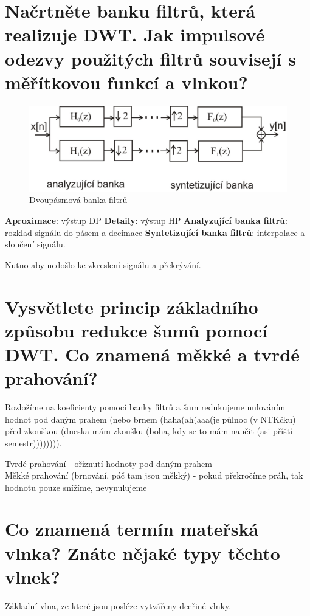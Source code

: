 \documentclass[a4paper,12pt]{article}   %
\begin{document}
\section{Načrtněte banku filtrů, která realizuje DWT. Jak impulsové odezvy použitých filtrů souvisejí s měřítkovou funkcí a vlnkou?}
\begin{figure}
        \centering
        \includegraphics[width=.6\textwidth]{fig/banka_filtru.png}
        \caption*{Dvoupásmová banka filtrů}
\end{figure}

\begin{outline}
        \1 \textbf{Aproximace}: výstup DP 
        \1 \textbf{Detaily}: výstup HP
        \1 \textbf{Analyzující banka filtrů}: rozklad signálu do pásem a decimace
        \1 \textbf{Syntetizující banka filtrů}: interpolace a sloučení signálu.
\end{outline}

Nutno aby nedošlo ke zkreslení signálu a překrývání. 


\section{Vysvětlete princip základního způsobu redukce šumů pomocí DWT. Co znamená měkké a tvrdé prahování?}

Rozložíme na koeficienty pomocí banky filtrů a šum redukujeme nulováním hodnot pod daným prahem (nebo brnem (haha(ah(aaa(je půlnoc (v NTKčku) před zkouškou (dneska mám zkoušku (boha, kdy se to mám naučit (asi příští semestr)))))))). 

Tvrdé prahování - oříznutí hodnoty pod daným prahem\\
Měkké prahování (brnování, páč tam jsou měkký) - pokud překročíme práh, tak hodnotu pouze snížíme, nevynulujeme



\section{Co znamená termín mateřská vlnka? Znáte nějaké typy těchto vlnek?}

Základní vlna, ze které jsou posléze vytvářeny dceřiné vlnky. 
\end{document}

